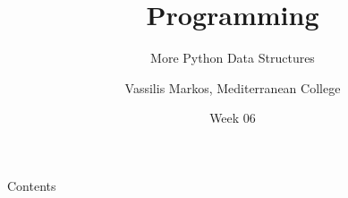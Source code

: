 \documentclass[aspectratio=169, 12pt, xcolor=table]{beamer}
\title{Programming}
\subtitle{More Python Data Structures}
\date{Week 06}
\author{Vassilis Markos, Mediterranean College}
\newcommand{\ohref}[1]{\href{#1}{\texttt{#1}}}
\begin{document}
	\begin{frame}
		\titlepage
	\end{frame}

	\begin{frame}{Contents}
		\tableofcontents
	\end{frame}

%	
%	
%
\end{document}
